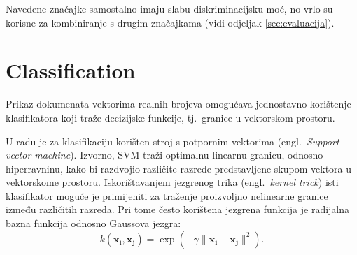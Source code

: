 \documentclass[11pt,english]{article}
\newcommand{\engl}[1]{(engl.~\emph{#1})}
\begin{document}
\begin{multicols}{2}
Navedene značajke samostalno imaju slabu diskriminacijsku moć, no vrlo su korisne
za kombiniranje s drugim značajkama (vidi odjeljak \ref{sec:evaluacija}).

\section{Classification}
Prikaz dokumenata vektorima realnih brojeva omogućava jednostavno korištenje
klasifikatora koji traže decizijske funkcije, tj.~granice u vektorskom
prostoru.


U radu je za klasifikaciju korišten stroj s potpornim vektorima \engl{Support
vector machine}. Izvorno, SVM traži optimalnu linearnu granicu, odnosno
hiperravninu, kako bi razdvojio različite razrede predstavljene skupom vektora u
vektorskome prostoru. Iskorištavanjem jezgrenog trika \engl{kernel trick} isti
klasifikator moguće je primijeniti za traženje proizvoljno nelinearne granice
između različitih razreda. Pri tome često korištena jezgrena funkcija je
radijalna bazna funkcija odnosno Gaussova jezgra:
\begin{equation}
k(\mathbf{x_i},\mathbf{x_j})=\exp(-\gamma \|\mathbf{x_i} - \mathbf{x_j}\|^2).
\end{equation}


\end{multicols}
\end{document}
